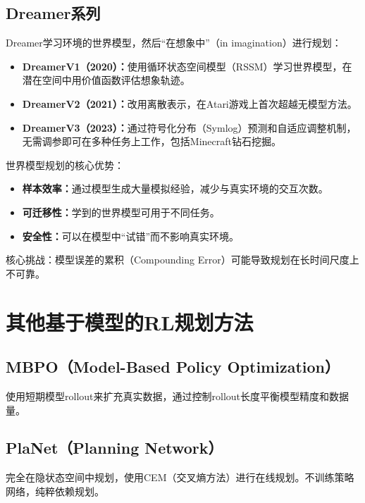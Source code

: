 \subsection{Dreamer系列 \grad}

Dreamer学习环境的世界模型，然后``在想象中''（in imagination）进行规划：

\begin{itemize}
  \item \textbf{DreamerV1（2020）：}使用循环状态空间模型（RSSM）学习世界模型，在潜在空间中用价值函数评估想象轨迹。
  \item \textbf{DreamerV2（2021）：}改用离散表示，在Atari游戏上首次超越无模型方法。
  \item \textbf{DreamerV3（2023）：}通过符号化分布（Symlog）预测和自适应调整机制，无需调参即可在多种任务上工作，包括Minecraft钻石挖掘。
\end{itemize}

\begin{keypoint}
世界模型规划的核心优势：
\begin{itemize}
  \item \textbf{样本效率：}通过模型生成大量模拟经验，减少与真实环境的交互次数。
  \item \textbf{可迁移性：}学到的世界模型可用于不同任务。
  \item \textbf{安全性：}可以在模型中``试错''而不影响真实环境。
\end{itemize}
核心挑战：模型误差的累积（Compounding Error）可能导致规划在长时间尺度上不可靠。
\end{keypoint}

\section{其他基于模型的RL规划方法 \self}

\subsection{MBPO（Model-Based Policy Optimization）}

使用短期模型rollout来扩充真实数据，通过控制rollout长度平衡模型精度和数据量。

\subsection{PlaNet（Planning Network）}

完全在隐状态空间中规划，使用CEM（交叉熵方法）进行在线规划。不训练策略网络，纯粹依赖规划。

